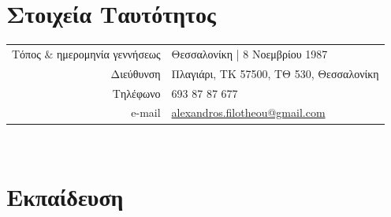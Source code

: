\documentclass[a4paper,10pt,twoside]{article}
\begin{document}


\par{\bigskip\par}

\section{Στοιχεία Ταυτότητος}

\begin{tabular}{rp{10cm}}
Τόπος $\&$ ημερομηνία γεννήσεως 	& Θεσσαλονίκη | 8 Νοεμβρίου 1987 \\
Διεύθυνση           			        & Πλαγιάρι, ΤΚ 57500, ΤΘ 530, Θεσσαλονίκη \\
Τηλέφωνο                          &  693 87 87 677 \\
e-mail                            & \href{mailto:alexandros.filotheou@gmail.com}{alexandros.filotheou@gmail.com}
\end{tabular}\\


\section{Εκπαίδευση}
\end{document}
